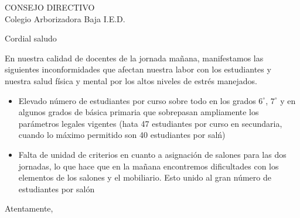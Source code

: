 \documentclass[letterpaper,spanish,11pt]{letter}
\begin{document}
\begin{letter}{CONSEJO DIRECTIVO\\Colegio Arborizadora Baja I.E.D.}
	
\opening{Cordial saludo}
En nuestra calidad de docentes de la jornada mañana, manifestamos las siguientes inconformidades que afectan nuestra labor con los estudiantes y nuestra salud física y mental por los altos niveles de estr\'{e}s manejados.
\begin{itemize}
\item Elevado n\'{u}mero de estudiantes por curso sobre todo en los grados $6^{\circ}$, $7^{\circ}$ y en algunos grados de básica primaria que sobrepasan ampliamente los par\'{a}metros legales vigentes (hata 47 estudiantes por curso en secundaria, cuando lo m\'{a}ximo permitido son 40 estudiantes por sal\'{n})
\item Falta de unidad de criterios en cuanto a asignación de salones para las dos jornadas, lo que hace que en la mañana encontremos dificultades con los elementos de los salones y el mobiliario. Esto unido al gran n\'{u}mero de estudiantes por sal\'{o}n
\end{itemize}
\closing{Atentamente,}


\end{letter}
\end{document}
